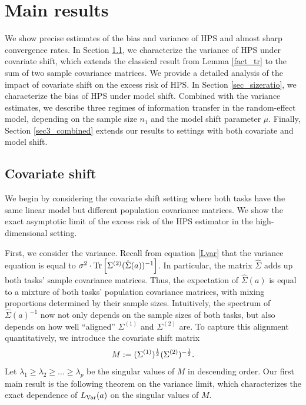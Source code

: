 \section{Main results}\label{sec_main}

We show precise estimates of the bias and variance of HPS and almost sharp convergence rates.
In Section \ref{sec3_cov}, we characterize the variance of HPS under covariate shift, which extends the classical result from Lemma \ref{fact_tr} to the sum of two sample covariance matrices.
We provide a detailed analysis of the impact of covariate shift on the excess risk of HPS.
In Section \ref{sec_sizeratio}, we characterize the bias of HPS under model shift.
Combined with the variance estimates, we describe three regimes of information transfer in the random-effect model, depending on the sample size $n_1$ and the model shift parameter $\mu$.
Finally, Section \ref{sec3_combined} extends our results to settings with both covariate and model shift.


\subsection{Covariate shift}\label{sec3_cov}

We begin by considering the covariate shift setting where both tasks have the same linear model but different population covariance matrices.
We show the exact asymptotic limit of the excess risk of the HPS estimator in the high-dimensional setting.

First, we consider the variance. Recall from equation \eqref{Lvar} that the variance equation is equal to $\sigma^2 \cdot \operatorname{Tr}\left[\Sigma^{(2)} (\hat\Sigma(a))^{-1}\right]$.
In particular, the matrix $\hat{\Sigma}$ adds up both tasks' sample covariance matrices.
Thus, the expectation of $\hat{\Sigma}(a)$ is equal to a mixture of both tasks' population covariance matrices, with mixing proportions determined by their sample sizes.
Intuitively, the spectrum of $\hat{\Sigma}(a)^{-1}$ now not only depends on the sample sizes of both tasks, but also depends on how well ``aligned'' $\Sigma^{(1)}$ and $\Sigma^{(2)}$ are.
To capture this alignment quantitatively, we introduce the covariate shift matrix %
$$ M := (\Sigma^{(1)})^{\frac 1 2}(\Sigma^{(2)})^{-\frac 1 2}.$$
Let $\lambda_1 \ge \lambda_2 \ge \dots\ge \lambda_p $ be the singular values of $M$ in descending order.
Our first main result is the following theorem on the variance limit, which characterizes the exact dependence of $L_{\operatorname{Var}}(a)$ on the singular values of $M$.


